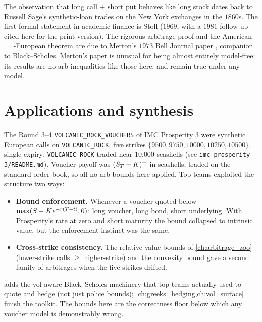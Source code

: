 \begin{historybox}
The observation that long call $+$ short put behaves like long
stock dates back to Russell Sage's synthetic-loan trades on the
New York exchanges in the $1860$s. The first formal statement
in academic finance is Stoll \citep{hostoll1981} ($1969$, with
a $1981$ follow-up cited here for the print version). The
rigorous arbitrage proof and the American-$=$-European theorem
are due to Merton's $1973$ Bell Journal paper
\citep{merton1973rational}, companion to Black--Scholes.
Merton's paper is unusual for being almost entirely model-free:
its results are no-arb inequalities like those here, and remain
true under any model.
\end{historybox}

\section{Applications and synthesis}
\label{sec:ch14_apps}

\begin{prosperitybox}
The Round 3--4 \texttt{VOLCANIC\_ROCK\_VOUCHERS} of IMC
Prosperity 3 were synthetic European calls on
\texttt{VOLCANIC\_ROCK}, five strikes
$\{9500, 9750, 10000, 10250, 10500\}$, single expiry;
\texttt{VOLCANIC\_ROCK} traded near 10{,}000 seashells (see
\texttt{imc-prosperity-3/README.md}). Voucher payoff was
$(S_T - K)^+$ in seashells, traded on the standard
order book, so all no-arb bounds here applied. Top teams
exploited the structure two ways:
\begin{itemize}
  \item \textbf{Bound enforcement.} Whenever a voucher quoted
  below $\max(S - K e^{-r(T-t)}, 0)$: long
  voucher, long bond, short underlying. With Prosperity's
  rate at zero and short maturity the bound collapsed to
  intrinsic value, but the enforcement instinct was the same.
  \item \textbf{Cross-strike consistency.} The relative-value
  bounds of \cref{ch:arbitrage_zoo} (lower-strike calls
  $\geq$ higher-strike) and the convexity bound gave a
  second family of arbitrages when the five strikes drifted.
\end{itemize}
 adds the vol-aware Black--Scholes
machinery that top teams actually used to quote and hedge (not
just police bounds); \cref{ch:greeks_hedging,ch:vol_surface}
finish the toolkit. The bounds here are the correctness floor
below which any voucher model is demonstrably wrong.
\end{prosperitybox}

